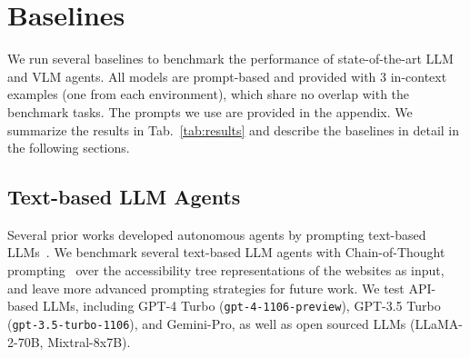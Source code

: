 \section{Baselines}  \label{sec:baselines}

We run several baselines to benchmark the performance of state-of-the-art LLM and VLM agents. All models are prompt-based and provided with 3 in-context examples (one from each environment), which share no overlap with the benchmark tasks. The prompts we use are provided in the appendix. We summarize the results in Tab.~\ref{tab:results} and describe the baselines in detail in the following sections.

\subsection{Text-based LLM Agents}

Several prior works developed autonomous agents by prompting text-based LLMs~\citep{zhou2023webarena,kim2023language,liu2023bolaa}. We benchmark several text-based LLM agents with Chain-of-Thought prompting~\cite{wei2022chain} over the accessibility tree representations of the websites as input, and leave more advanced prompting strategies for future work. We test API-based LLMs, including GPT-4 Turbo (\texttt{gpt-4-1106-preview}), GPT-3.5 Turbo (\texttt{gpt-3.5-turbo-1106}), and Gemini-Pro, as well as open sourced LLMs (LLaMA-2-70B, Mixtral-8x7B).


